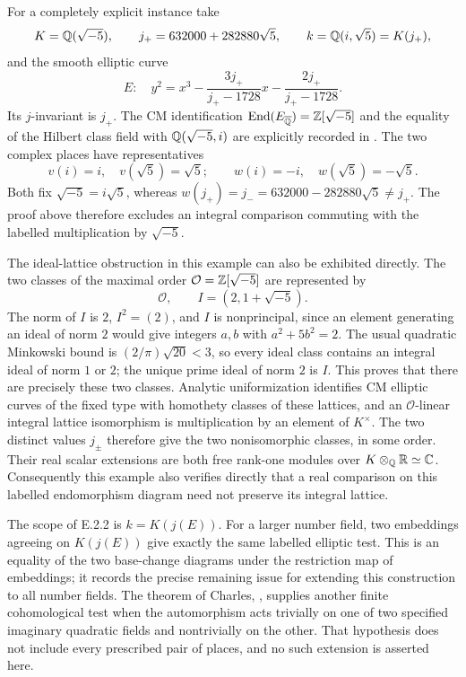 For a completely explicit instance take
\[
 K=\mathbb Q(\sqrt{-5}),\qquad
 j_+=632000+282880\sqrt5,\qquad
 k=\mathbb Q(i,\sqrt5)=K(j_+),
\]
and the smooth elliptic curve
\[
 E:\quad y^2=x^3-\frac{3j_+}{j_+-1728}x
                         -\frac{2j_+}{j_+-1728}.
 \tag{E.2.2a}
\]
Its $j$-invariant is $j_+$. The CM identification
$\operatorname{End}(E_{\overline{\mathbb Q}})=\mathbb Z[\sqrt{-5}]$ and the equality of the Hilbert class field with $\mathbb Q(\sqrt{-5},i)$ are explicitly recorded in \cite[Section 5, preprint p.~11, immediately before (19)]{GenCampagnaPengo2022}. The two complex places have representatives
\[
 v(i)=i,\quad v(\sqrt5)=\sqrt5;\qquad
 w(i)=-i,\quad w(\sqrt5)=-\sqrt5.
\]
Both fix $\sqrt{-5}=i\sqrt5$, whereas $w(j_+)=j_-=632000-282880\sqrt5\ne j_+$. The proof above therefore excludes an integral comparison commuting with the labelled multiplication by $\sqrt{-5}$.

The ideal-lattice obstruction in this example can also be exhibited directly. The two classes of the maximal order $\mathcal O=\mathbb Z[\sqrt{-5}]$ are represented by
\[
 \mathcal O,\qquad I=(2,1+\sqrt{-5}).
\]
The norm of $I$ is $2$, $I^2=(2)$, and $I$ is nonprincipal, since an element generating an ideal of norm $2$ would give integers $a,b$ with $a^2+5b^2=2$. The usual quadratic Minkowski bound is $(2/\pi)\sqrt{20}<3$, so every ideal class contains an integral ideal of norm $1$ or $2$; the unique prime ideal of norm $2$ is $I$. This proves that there are precisely these two classes. Analytic uniformization identifies CM elliptic curves of the fixed type with homothety classes of these lattices, and an $\mathcal O$-linear integral lattice isomorphism is multiplication by an element of $K^\times$. The two distinct values $j_\pm$ therefore give the two nonisomorphic classes, in some order. Their real scalar extensions are both free rank-one modules over $K\otimes_\mathbb Q\mathbb R\simeq\mathbb C$. Consequently this example also verifies directly that a real comparison on this labelled endomorphism diagram need not preserve its integral lattice.

The scope of E.2.2 is $k=K(j(E))$. For a larger number field, two embeddings agreeing on $K(j(E))$ give exactly the same labelled elliptic test. This is an equality of the two base-change diagrams under the restriction map of embeddings; it records the precise remaining issue for extending this construction to all number fields. The theorem of Charles, \cite[Theorem 2]{Charles2009}, supplies another finite cohomological test when the automorphism acts trivially on one of two specified imaginary quadratic fields and nontrivially on the other. That hypothesis does not include every prescribed pair of places, and no such extension is asserted here.


